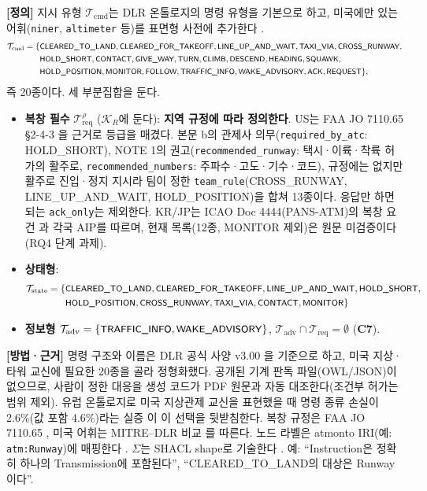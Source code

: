 \documentclass[10pt,a4paper]{article}
\newcommand{\Tcmd}{\mathcal{T}_{\mathrm{cmd}}}
\newcommand{\Treq}{\mathcal{T}_{\mathrm{req}}}
\newcommand{\Tst}{\mathcal{T}_{\mathrm{state}}}
\newcommand{\Tadv}{\mathcal{T}_{\mathrm{adv}}}
\newcommand{\KR}{\mathcal{K}_R}
\newcommand{\cmd}[1]{\textsf{\small #1}}
\newcommand{\ch}[1]{\textbf{\textcolor{red!60!black}{#1}}}
\begin{document}
\textbf{[정의]} 지시 유형 $\Tcmd$는 DLR 온톨로지의 명령 유형을 기본으로 하고, 미국에만 있는 어휘(\texttt{niner}, \texttt{altimeter} 등)를 표면형 사전에 추가한다 \cite{chen2023}.
\begin{align*}
\Tcmd = \{&\cmd{CLEARED\_TO\_LAND}, \cmd{CLEARED\_FOR\_TAKEOFF}, \cmd{LINE\_UP\_AND\_WAIT}, \cmd{TAXI\_VIA}, \cmd{CROSS\_RUNWAY},\\
&\cmd{HOLD\_SHORT}, \cmd{CONTACT}, \cmd{GIVE\_WAY}, \cmd{TURN}, \cmd{CLIMB}, \cmd{DESCEND}, \cmd{HEADING}, \cmd{SQUAWK},\\
&\cmd{HOLD\_POSITION}, \cmd{MONITOR}, \cmd{FOLLOW}, \cmd{TRAFFIC\_INFO}, \cmd{WAKE\_ADVISORY}, \cmd{ACK}, \cmd{REQUEST}\},
\end{align*}
즉 20종이다. 세 부분집합을 둔다.
\begin{itemize}
\item \textbf{복창 필수} $\Treq^{\rho}$ ($\KR$에 둔다): \textbf{지역 규정에 따라 정의한다}. US는 FAA JO 7110.65 §2-4-3 \cite{faa7110}을 근거로 등급을 매겼다. 본문 b의 관제사 의무(\texttt{required\_by\_atc}: \cmd{HOLD\_SHORT}), NOTE 1의 권고(\texttt{recommended\_runway}: 택시·이륙·착륙 허가의 활주로, \texttt{recommended\_numbers}: 주파수·고도·기수·코드), 규정에는 없지만 활주로 진입·정지 지시라 팀이 정한 \texttt{team\_rule}(\cmd{CROSS\_RUNWAY}, \cmd{LINE\_UP\_AND\_WAIT}, \cmd{HOLD\_POSITION})을 합쳐 13종이다. 응답만 하면 되는 \texttt{ack\_only}는 제외한다. KR/JP는 ICAO Doc 4444(PANS-ATM)의 복창 요건 \cite{icao4444}과 각국 AIP를 따르며, 현재 목록(12종, \cmd{MONITOR} 제외)은 원문 미검증이다 (RQ4 단계 과제).
\item \textbf{상태형}:
\begin{align*}\Tst = \{&\cmd{CLEARED\_TO\_LAND},\cmd{CLEARED\_FOR\_TAKEOFF},\cmd{LINE\_UP\_AND\_WAIT},\cmd{HOLD\_SHORT},\\ &\cmd{HOLD\_POSITION},\cmd{CROSS\_RUNWAY},\cmd{TAXI\_VIA},\cmd{CONTACT},\cmd{MONITOR}\}\end{align*}
\item \textbf{정보형} $\Tadv = \{\cmd{TRAFFIC\_INFO},\cmd{WAKE\_ADVISORY}\}$, $\Tadv \cap \Treq = \emptyset$ (\ch{C7}).
\end{itemize}

\textbf{[방법·근거]} 명령 구조와 이름은 DLR 공식 사양 v3.00 \cite{dlr2025}을 기준으로 하고, 미국 지상·타워 교신에 필요한 20종을 골라 정형화했다. 공개된 기계 판독 파일(OWL/JSON)이 없으므로, 사람이 정한 대응을 생성 코드가 PDF 원문과 자동 대조한다(조건부 허가는 범위 제외). 유럽 온톨로지로 미국 지상관제 교신을 표현했을 때 명령 종류 손실이 2.6\%(값 포함 4.6\%)라는 실증 \cite{helmke2025loss}이 이 선택을 뒷받침한다. 복창 규정은 FAA JO 7110.65 \cite{faa7110}, 미국 어휘는 MITRE--DLR 비교 \cite{chen2023}를 따른다. 노드 라벨은 atmonto IRI(예: \texttt{atm:Runway})에 매핑한다 \cite{keller2017,keller2019}. $\Sigma$는 SHACL shape로 기술한다 \cite{shacl}. 예: ``\cmd{Instruction}은 정확히 하나의 \cmd{Transmission}에 포함된다'', ``\cmd{CLEARED\_TO\_LAND}의 대상은 \cmd{Runway}이다''.
\end{document}
